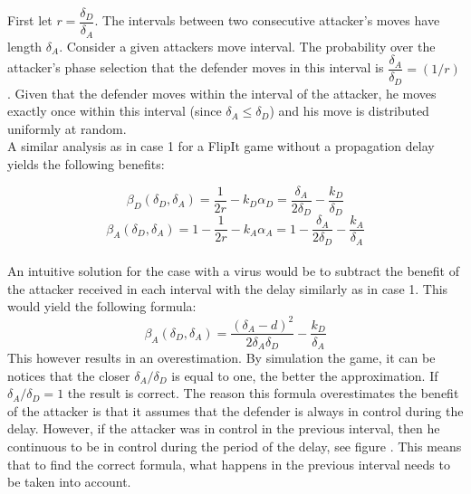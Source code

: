 First let $r = \dfrac{\delta_{D}}{ \delta_{A} }$. The intervals between two consecutive attacker's moves have length $\delta_{A}$. Consider a given attackers move interval. The probability over the attacker's phase selection that the defender moves in this interval is $\dfrac{\delta_{A}}{ \delta_{D} } = (1/r)$. Given that the defender moves within the interval of the attacker, he moves exactly once within this interval (since $\delta_{A} \leq \delta_{D} $) and his move is distributed uniformly at random. \\

A similar analysis as in case 1 for a FlipIt game without a propagation delay yields the following benefits:

\begin{equation*}
\beta_{D}(\delta_{D},\delta_{A}) = \dfrac {1} {2r} - k_{D} \alpha_{D} = \dfrac {\delta_{A}} {2\delta_{D}} - \dfrac{k_{D} }{\delta_{D}} 
\end{equation*}
\begin{equation*}
\beta_{A}(\delta_{D},\delta_{A}) =1 - \dfrac {1} {2r} - k_{A} \alpha_{A} = 1- \dfrac {\delta_{A}} {2\delta_{D}} - \dfrac{k_{A}}{ \delta_{A}}  
\end{equation*}\\

An intuitive solution for the case with a virus would be to subtract the benefit of the attacker received in each interval with the delay similarly as in case 1. This would yield the following formula:
\begin{equation*}
\beta_{A}(\delta_{D},\delta_{A})=\dfrac{(\delta_{A} - d)^2}{2\delta_{A}\delta_{D}} - \dfrac{k_{D}}{\delta_{A}}
\end{equation*}
This however results in an overestimation. By simulation the game, it can be notices that the closer $\delta_{A}/\delta_{D}$ is equal to one, the better the approximation. If $\delta_{A}/\delta_{D} = 1$ the result is correct. The reason this formula overestimates the benefit of the attacker is that it assumes that the defender is always in control during the delay. However, if the attacker was in control in the previous interval, then he continuous to be in control during the period of the delay, see figure . This means that to find the correct formula, what happens in the previous interval needs to be taken into account. \\

